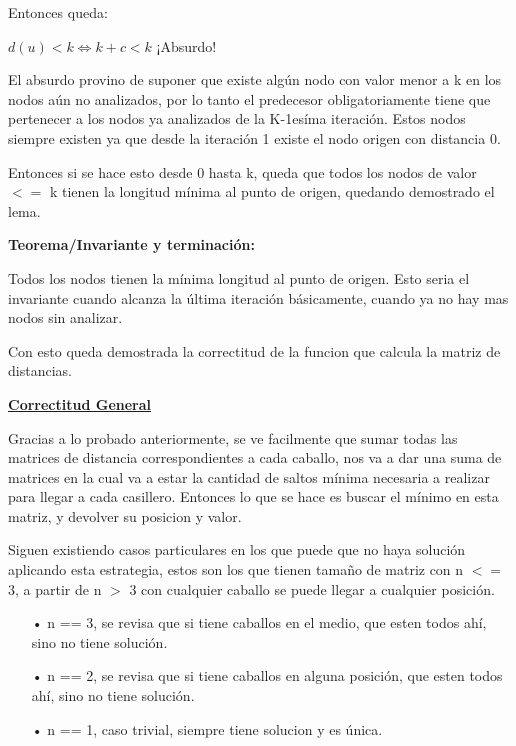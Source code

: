 \bigskip
Entonces queda:

\begin{center}
 $d(u) < k \Longleftrightarrow k + c < k$ ¡Absurdo!
\end{center}

\bigskip
El absurdo provino de suponer que existe algún nodo con valor menor a k en los nodos aún no analizados, por lo tanto el predecesor obligatoriamente tiene que pertenecer a los nodos ya analizados de la K-1esíma iteración. Estos nodos siempre existen ya que desde la iteración 1 existe el nodo origen con distancia 0.

Entonces si se hace esto desde 0 hasta k, queda que todos los nodos de valor $<=$ k tienen la longitud mínima al punto de origen, quedando demostrado el lema.

\newpage
\textbf{Teorema/Invariante y terminación:}

Todos los nodos tienen la mínima longitud al punto de origen. Esto seria el invariante cuando alcanza la última iteración básicamente, cuando ya no hay mas nodos sin analizar.

Con esto queda demostrada la correctitud de la funcion que calcula la matriz de distancias.

\bigskip
\noindent \underline{\textbf{Correctitud General}}

Gracias a lo probado anteriormente, se ve facilmente que sumar todas las matrices de distancia correspondientes a cada caballo, nos va a dar una suma de matrices en la cual va a estar la cantidad de saltos mínima necesaria a realizar para llegar a cada casillero. Entonces lo que se hace es buscar el mínimo en esta matriz, y devolver su posicion y valor.

Siguen existiendo casos particulares en los que puede que no haya solución aplicando esta estrategia, estos son los que tienen tamaño de matriz con n $<=$ 3, a partir de n $>$ 3 con cualquier caballo se puede llegar a cualquier posición.

\begin{enumerate}
\item[•] n == 3, se revisa que si tiene caballos en el medio, que esten todos ahí, sino no tiene solución.
\item[•] n == 2, se revisa que si tiene caballos en alguna posición, que esten todos ahí, sino no tiene solución.
\item[•] n == 1, caso trivial, siempre tiene solucion y es única.
\end{enumerate}

